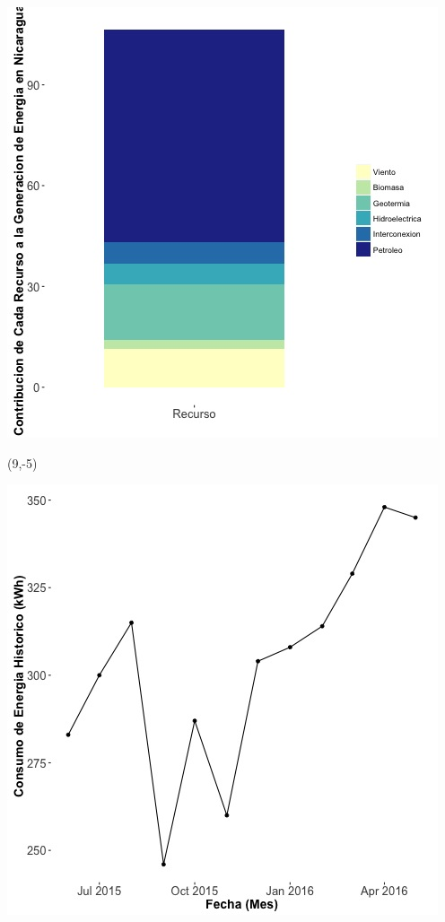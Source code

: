 \documentclass{article}\usepackage[]{graphicx}\usepackage[]{color}
\newenvironment{knitrout}{}{} %
\begin{document}
\begin{knitrout}
\color{fgcolor}
\includegraphics[scale=0.65]{figure/gridplot2.jpg} 
\end{knitrout}

 \begin{textblock}{1}(9,-5)
\begin{minipage}{20em}
\begingroup

\endgroup
\end{minipage}
\end{textblock}

\begin{knitrout}
\color{fgcolor}
\includegraphics[scale=0.65]{figure/A17_historico_energia} 
\end{knitrout}
\end{document}
